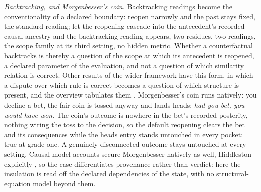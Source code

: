 \textit{Backtracking, and Morgenbesser's coin.} Backtracking readings become the conventionality of a declared boundary: reopen narrowly and the past stays fixed, the standard reading; let the reopening cascade into the antecedent's recorded causal ancestry and the backtracking reading appears, two residues, two readings, the scope family at its third setting, no hidden metric. Whether a counterfactual backtracks is thereby a question of the scope at which its antecedent is reopened, a declared parameter of the evaluation, and not a question of which similarity relation is correct. Other results of the wider framework have this form, in which a dispute over which rule is correct becomes a question of which structure is present, and the overview tabulates them \parencite{AethusBrief}. Morgenbesser's coin runs natively: you decline a bet, the fair coin is tossed anyway and lands heads; \emph{had you bet, you would have won}. The coin's outcome is nowhere in the bet's recorded posterity, nothing wiring the toss to the decision, so the default reopening clears the bet and its consequences while the heads entry stands untouched in every pocket: true at grade one. A genuinely disconnected outcome stays untouched at every setting. Causal-model accounts secure Morgenbesser natively as well, Hiddleston explicitly \parencite*{hiddleston2005}, so the case differentiates provenance rather than verdict: here the insulation is read off the declared dependencies of the state, with no structural-equation model beyond them.

